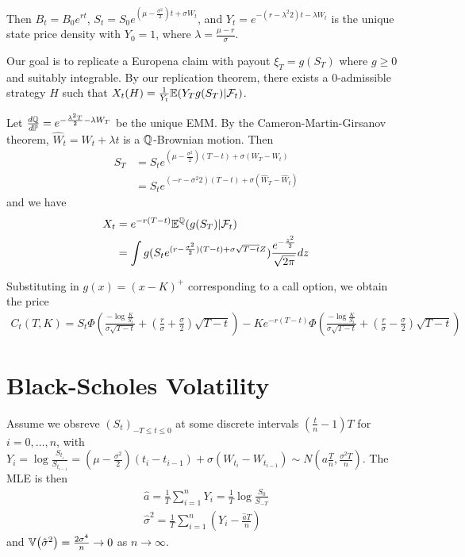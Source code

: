 Then $B_t = B_{0} e^{rt}$, $S_{t} = S_{0} e^{(\mu -
  \frac{\sigma^{2}}{2})t + \sigma W_{t}}$, and $Y_{t} = e^{-(r -
  \lambda^{2}{2})t - \lambda W_{t}}$ is the unique state price density
with $Y_{0} = 1$, where $\lambda = \frac{\mu - r}{\sigma}$.

Our goal is to replicate a Europena claim with payout $\xi_{T} =
g(S_{T})$ where $g \geq 0$ and suitably integrable.  By our
replication theorem, there exists a 0-admissible strategy $H$ such
that $X_{t}(H) = \frac{1}{Y_{t}} \E{Y_{T} g(S_{T}) |
  \mathcal{F}_{t}}$.

Let $\frac{d\Q}{d\Prob} = e^{-\frac{\lambda^{2}T}{2} - \lambda W_{T}}$
be the unique EMM.  By the Cameron-Martin-Girsanov theorem, $\hat
W_{t} = W_{t} + \lambda t$ is a $\Q$-Brownian motion.  Then
\begin{align}
  \label{eq:89}
  S_{T} &= S_{t} e^{(\mu - \frac{\sigma^{2}}{2})(T-t) + \sigma(W_{T} -
    W_{t})} \\
  &= S_{t} e^{(-r - \sigma^{2}{2})(T-t) + \sigma(\hat W_{T} - \hat W_{t})}
\end{align} and we have
\begin{align}
  \label{eq:88}
  X_{t} &= e^{-r(T-t)} \mathbb{E}^{\Q}(g(S_{T}) | \mathcal{F}_{t}) \\
  &= \int g(S_{t} e^{(r - \frac{\sigma^{2}}{2})(T-t) +
    \sigma\sqrt{T-t} Z}) \frac{e^{-\frac{z^{2}}{2}}}{\sqrt{2 \pi}} dz
\end{align}

Substituting in $g(x) = (x - K)^{+}$ corresponding to a call option,
we obtain the price
\begin{align}
  \label{eq:90}
  C_{t}(T, K) = S_{t} \Phi(\frac{-\log \frac{K}{S_{t}}}{\sigma \sqrt{T
      - t}} + (\frac{r}{\sigma} + \frac{\sigma}{2})\sqrt{T-t}) -
  Ke^{-r(T-t)} \Phi(\frac{-\log \frac{K}{S_{t}}}{\sigma \sqrt{T-t}} +
  (\frac{r}{\sigma} - \frac{\sigma}{2}) \sqrt{T-t})
\end{align}


\section{Black-Scholes Volatility}
\label{sec:black-schol-volat}

Assume we obsreve $(S_{t})_{-T \leq t \leq 0}$ at some discrete intervals $(\frac{t}{n} -
1)T$ for $i = 0, \dots, n$, with $Y_{i} = \log
\frac{S_{t_{i}}}{S_{t_{i-1}}} = (\mu - \frac{\sigma^{2}}{2})(t_{i} -
t_{i-1}) + \sigma(W_{t_{i}} - W_{t_{i-1}}) \sim N(a\frac{T}{n},
\frac{\sigma^{2}T}{n})$.  The MLE is then
\begin{align}
  \label{eq:91}
  \hat a = \frac{1}{T} \sum_{i=1}^{n} Y_{i} = \frac{1}{T} \log \frac{S_{0}}{S_{-T}} \\
  \hat \sigma^{2} = \frac{1}{T} \sum_{i=1}^{n} (Y_{i} - \frac{\hat a
    T}{n})
\end{align} and $\Var{\hat \sigma^{2}} = \frac{2\sigma^{4}}{n}
\rightarrow 0$ as $n \rightarrow \infty$.


